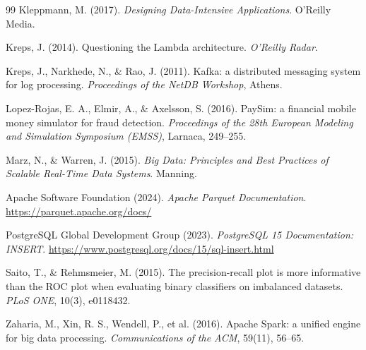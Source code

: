 \documentclass[11pt,a4paper]{article}
\begin{document}
\begin{thebibliography}{99}
Kleppmann, M. (2017). \emph{Designing Data-Intensive Applications}. O'Reilly Media.

Kreps, J. (2014). Questioning the Lambda architecture. \emph{O'Reilly Radar}.

Kreps, J., Narkhede, N., \& Rao, J. (2011). Kafka: a distributed messaging system
for log processing. \emph{Proceedings of the NetDB Workshop}, Athens.

Lopez-Rojas, E. A., Elmir, A., \& Axelsson, S. (2016). PaySim: a financial mobile
money simulator for fraud detection. \emph{Proceedings of the 28th European
Modeling and Simulation Symposium (EMSS)}, Larnaca, 249--255.

Marz, N., \& Warren, J. (2015). \emph{Big Data: Principles and Best Practices of
Scalable Real-Time Data Systems}. Manning.

Apache Software Foundation (2024). \emph{Apache Parquet Documentation}.
\url{https://parquet.apache.org/docs/}

PostgreSQL Global Development Group (2023). \emph{PostgreSQL 15 Documentation:
INSERT}. \url{https://www.postgresql.org/docs/15/sql-insert.html}

Saito, T., \& Rehmsmeier, M. (2015). The precision-recall plot is more informative
than the ROC plot when evaluating binary classifiers on imbalanced datasets.
\emph{PLoS ONE}, 10(3), e0118432.

Zaharia, M., Xin, R. S., Wendell, P., et al. (2016). Apache Spark: a unified
engine for big data processing. \emph{Communications of the ACM}, 59(11), 56--65.

\end{thebibliography}
\end{document}
